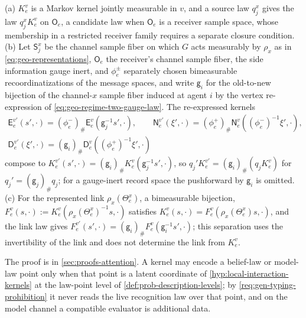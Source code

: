 (a) \(K^v_e\) is a Markov kernel jointly measurable in \(v\), and a source law
\(q_j^x\) gives the law \(q_j^xK_e^v\) on \(\mathsf O_e\), a candidate law when
\(\mathsf O_e\) is a receiver sample space, whose membership in a restricted
receiver family requires a separate closure condition. (b) Let
\(\mathsf S_j^x\) be the channel sample fiber on which \(G\) acts measurably by
\(\rho_x\) as in \eqref{eq:geo-representations}, \(\mathsf O_e\) the receiver's
channel sample fiber, the side information gauge inert, and \(\phi_e^\pm\)
separately chosen bimeasurable recoordinatizations of the message spaces, and
write \(\mathsf g_i\) for the old-to-new bijection of the channel-\(x\) sample
fiber induced at agent \(i\) by the vertex re-expression of
\eqref{eq:geo-regime-two-gauge-law}. The re-expressed kernels
\begin{equation}
\begin{gathered}
\mathsf E_e^{v\prime}(s',\cdot)=(\phi_e^-)_\#\mathsf E_e^v(\mathsf g_j^{-1}s',\cdot),
\qquad
\mathsf N_e^{v\prime}(\xi',\cdot)=(\phi_e^+)_\#\mathsf N_e^v((\phi_e^-)^{-1}\xi',\cdot),\\
\mathsf D_e^{v\prime}(\xi',\cdot)=(\mathsf g_i)_\#\mathsf D_e^v((\phi_e^+)^{-1}\xi',\cdot)
\end{gathered}
\label{eq:obs-selective-kernel-gauge}
\end{equation}
compose to \(K_e^{v\prime}(s',\cdot)=(\mathsf g_i)_\#K_e^v(\mathsf g_j^{-1}s',\cdot)\),
so \(q_j'K_e^{v\prime}=(\mathsf g_i)_\#(q_jK_e^v)\) for
\(q_j'=(\mathsf g_j)_\#q_j\); for a gauge-inert record space the pushforward by
\(\mathsf g_i\) is omitted. (c) For the represented link
\(\rho_x(\Theta^x_e)\), a bimeasurable bijection,
\(F_e^v(s,\cdot):=K_e^v(\rho_x(\Theta^x_e)^{-1}s,\cdot)\) satisfies
\(K_e^v(s,\cdot)=F_e^v(\rho_x(\Theta^x_e)s,\cdot)\), and the link law gives
\(F_e^{v\prime}(s',\cdot)=(\mathsf g_i)_\#F_e^v(\mathsf g_i^{-1}s',\cdot)\); this
separation uses the invertibility of the link and does not determine the link
from \(K_e^v\).

The proof is in \cref{sec:proofs-attention}.
A kernel may encode a belief-law or model-law point only when that point is a
latent coordinate of \cref{hyp:local-interaction-kernels} at the law-point
level of \cref{def:prob-description-levels}; by
\cref{req:gen-typing-prohibition} it never reads the live recognition law over
that point, and on the model channel a compatible evaluator is additional data.

